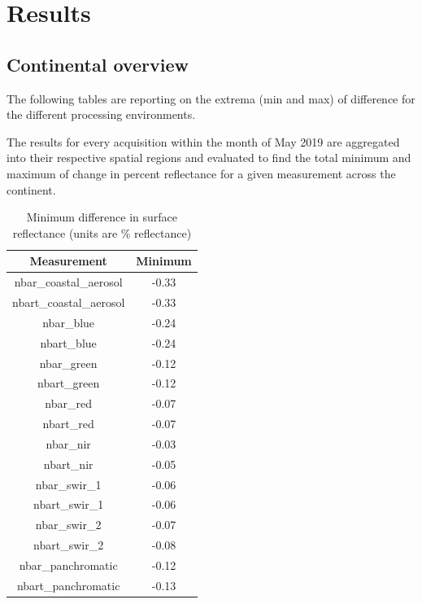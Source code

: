 \documentclass[a4paper]{article}
\begin{document}
  \newpage

  \section{Results}

    \subsection{Continental overview}

    \begin{flushleft}
      The following tables are reporting on the extrema (min and max) of difference for the different processing environments. \par
      The results for every acquisition within the month of May 2019 are aggregated into their respective spatial regions and evaluated to find the total minimum and maximum of change in percent reflectance for a given measurement across the continent. \par
    \end{flushleft}

    \begin{table}[ht!]
      \caption{Minimum difference in surface reflectance (units are \% reflectance)}\label{table:1}
      \centering
      \begin{tabular}{cc} \midrule
        \textbf{Measurement} & \textbf{Minimum} \\ \midrule
        nbar\_coastal\_aerosol & -0.33 \\
        nbart\_coastal\_aerosol & -0.33 \\
        nbar\_blue & -0.24 \\
        nbart\_blue & -0.24 \\
        nbar\_green & -0.12 \\
        nbart\_green & -0.12 \\
        nbar\_red & -0.07 \\
        nbart\_red & -0.07 \\
        nbar\_nir & -0.03 \\
        nbart\_nir & -0.05 \\
        nbar\_swir\_1 & -0.06 \\
        nbart\_swir\_1 & -0.06 \\
        nbar\_swir\_2 & -0.07 \\
        nbart\_swir\_2 & -0.08 \\
        nbar\_panchromatic & -0.12 \\
        nbart\_panchromatic & -0.13 \\ \midrule
      \end{tabular}
    \end{table}
\end{document}
